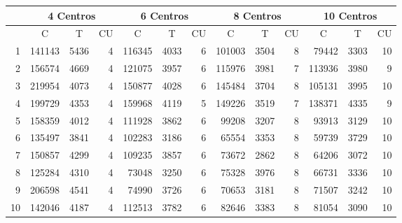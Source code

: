 \documentclass{article}
\begin{document}
  \begin{center}
    \begin{tabular}{ | r | r | r | r | r | r | r | r | r | r | r | r | r | }
      \hline
      \rowcolor{DarkGrey}
      & \multicolumn{3}{|c|}{4 Centros} & \multicolumn{3}{c|}{6 Centros} & \multicolumn{3}{|c|}{8 Centros} & \multicolumn{3}{|c|}{10 Centros} \\ \hline
      \rowcolor{DarkGrey}
      \multicolumn{1}{|c|}{Réplica} & \multicolumn{1}{|c|}{C} & \multicolumn{1}{|c|}{T} & \multicolumn{1}{|c|}{CU} & \multicolumn{1}{|c|}{C} & \multicolumn{1}{|c|}{T} & \multicolumn{1}{|c|}{CU} & \multicolumn{1}{|c|}{C} & \multicolumn{1}{|c|}{T} & \multicolumn{1}{|c|}{CU} & \multicolumn{1}{|c|}{C} & \multicolumn{1}{|c|}{T} & \multicolumn{1}{|c|}{CU} \\ \hline \hline
      1 & 141143 & 5436 & 4 & 116345 & 4033 & 6 & 101003 & 3504 & 8 & 79442 & 3303 & 10 \\ \hline
      \rowcolor{LightGrey}
      2 & 156574 & 4669 & 4 & 121075 & 3957 & 6 & 115976 & 3981 & 7 & 113936 & 3980 & 9 \\ \hline
      3 & 219954 & 4073 & 4 & 150877 & 4028 & 6 & 145484 & 3704 & 8 & 105131 & 3995 & 10 \\ \hline
      \rowcolor{LightGrey}
      4 & 199729 & 4353 & 4 & 159968 & 4119 & 5 & 149226 & 3519 & 7 & 138371 & 4335 & 9\\ \hline
      5 & 158359 & 4012 & 4 & 111928 & 3862 & 6 & 99208 & 3207 & 8 & 93913 & 3129 & 10\\ \hline
      \rowcolor{LightGrey}
      6 & 135497 & 3841 & 4 & 102283 & 3186 & 6 & 65554 & 3353 & 8 & 59739 & 3729 & 10  \\ \hline
      7 & 150857 & 4299 & 4 & 109235 & 3857 & 6 & 73672 & 2862 & 8 & 64206 & 3072 & 10  \\ \hline
      \rowcolor{LightGrey}
      8 & 125284 & 4310 & 4 & 73048 & 3250 & 6 & 75328 & 3976 & 8 & 66731 & 3336 & 10  \\ \hline
      9 & 206598 & 4541 & 4 & 74990 & 3726 & 6 & 70653 & 3181 & 8 & 71507 & 3242 & 10 \\ \hline
      \rowcolor{LightGrey}
      10 & 142046 & 4187 & 4 & 112513 & 3782 & 6 & 82646 & 3383 & 8 & 81054 & 3090 & 10 \\ \hline
    \end{tabular}
    \label{table:T4}
  \end{center}
\end{document}
